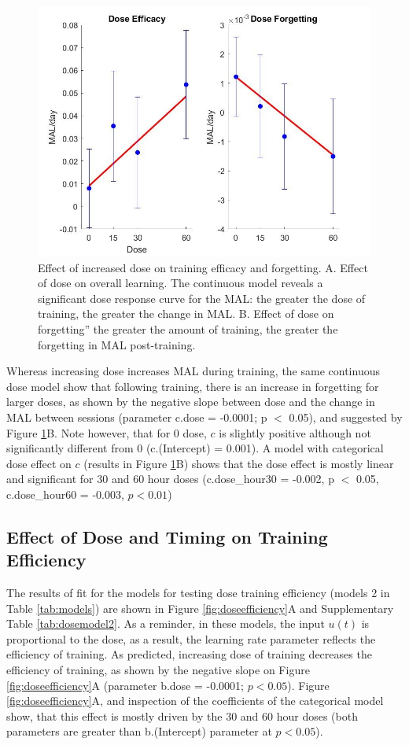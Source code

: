 \begin{figure}
	\centering
	\includegraphics[width=0.7\linewidth]{figures/doseEfficacy}
	\caption[Effect of increased dose on training efficacy and forgetting.]{
		Effect of increased dose on training efficacy and forgetting.
		A. Effect of dose on overall learning. The continuous model reveals a significant dose response curve for the MAL: the greater the dose of training, the greater the change in MAL. 
		B. Effect of dose on forgetting” the greater the amount of training, the greater the forgetting in MAL post-training.}
	\label{fig:doseefficacy}
\end{figure}


Whereas increasing dose increases MAL during training, the same continuous dose model show that following training, there is an increase in forgetting for larger doses, as shown by the negative slope between dose and the change in MAL between sessions (parameter c.dose = -0.0001; p $ < $ 0.05), and suggested by Figure \ref{fig:doseefficacy}B. 
Note however, that for 0 dose, $ c $ is slightly positive although not significantly different from 0 (c.(Intercept) = 0.001). A model with categorical dose effect on $ c $ (results in Figure \ref{fig:doseefficacy}B) shows that the dose effect is mostly linear and significant for 30 and 60 hour doses (c.dose\_hour30 = -0.002, p $ < $ 0.05,  c.dose\_hour60 = -0.003, $ p < 0.01 $)

\subsection{Effect of Dose and Timing on Training Efficiency}
The results of fit for the models for testing dose training efficiency (models 2 in Table \ref{tab:models}) are shown in Figure \ref{fig:doseefficiency}A and Supplementary Table \ref{tab:dosemodel2}. 
As a reminder, in these models, the input $ u(t) $ is proportional to the dose, as a result, the learning rate parameter reflects the efficiency of training. 
As predicted, increasing dose of training decreases the efficiency of training, as shown by the negative slope on Figure \ref{fig:doseefficiency}A (parameter b.dose = -0.0001; $ p < 0.05 $). 
Figure \ref{fig:doseefficiency}A, and inspection of the coefficients of the categorical model show, that this effect is mostly driven by the 30 and 60 hour doses (both parameters are greater than b.(Intercept) parameter at $ p < 0.05 $).



